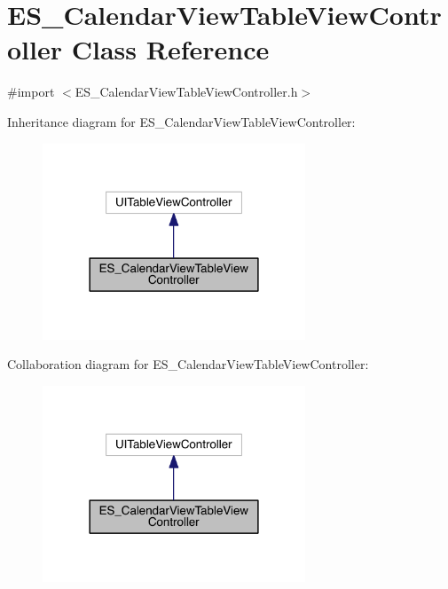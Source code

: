 \hypertarget{interface_e_s___calendar_view_table_view_controller}{\section{E\+S\+\_\+\+Calendar\+View\+Table\+View\+Controller Class Reference}
\label{interface_e_s___calendar_view_table_view_controller}
}


{\ttfamily \#import $<$E\+S\+\_\+\+Calendar\+View\+Table\+View\+Controller.\+h$>$}



Inheritance diagram for E\+S\+\_\+\+Calendar\+View\+Table\+View\+Controller\+:\nopagebreak
\begin{figure}[H]
\begin{center}
\leavevmode
\includegraphics[width=222pt]{d7/d43/interface_e_s___calendar_view_table_view_controller__inherit__graph}
\end{center}
\end{figure}


Collaboration diagram for E\+S\+\_\+\+Calendar\+View\+Table\+View\+Controller\+:\nopagebreak
\begin{figure}[H]
\begin{center}
\leavevmode
\includegraphics[width=222pt]{d0/df0/interface_e_s___calendar_view_table_view_controller__coll__graph}
\end{center}
\end{figure}
